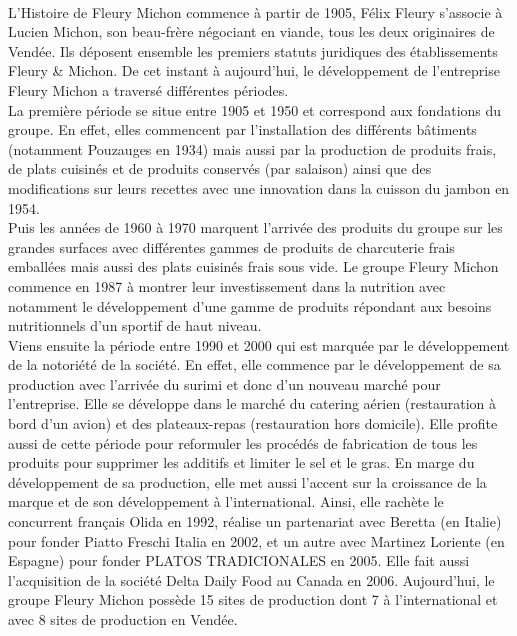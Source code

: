 \documentclass[a4paper,12pt]{extarticle}
\newcommand{\alinea}{\hspace*{0.4cm}}
\begin{document}
		\paragraph{}

	L’Histoire de Fleury Michon commence à partir de 1905, Félix Fleury s'associe à Lucien Michon, son beau-frère négociant en viande, tous les deux originaires de Vendée. Ils déposent ensemble les premiers statuts juridiques des établissements Fleury \& Michon. De cet instant à aujourd’hui, le développement de l’entreprise Fleury Michon a traversé différentes périodes.\\
\alinea
	La première période se situe entre 1905 et 1950 et correspond aux fondations du groupe. En effet, elles commencent par l’installation des différents bâtiments (notamment Pouzauges en 1934) mais aussi par la production de produits frais, de plats cuisinés et de produits conservés (par salaison) ainsi que des modifications sur leurs recettes avec une innovation dans la cuisson du jambon en 1954.\\
\alinea
    Puis les années de 1960 à 1970 marquent l’arrivée des produits du groupe sur les grandes surfaces avec différentes gammes de produits de charcuterie frais emballées mais aussi des plats cuisinés frais sous vide. Le groupe Fleury Michon commence en 1987 à montrer leur investissement dans la nutrition avec notamment le développement d’une gamme de produits répondant aux besoins nutritionnels d’un sportif de haut niveau.\\
\alinea
    Viens ensuite la période entre 1990 et 2000 qui est marquée par le développement de la notoriété de la société. En effet, elle commence par le développement de sa production avec l’arrivée du surimi et donc d’un nouveau marché pour l’entreprise. Elle se développe dans le marché du catering aérien (restauration à bord d’un avion) et des plateaux-repas (restauration hors domicile). Elle profite aussi de cette période pour reformuler les procédés de fabrication de tous les produits pour supprimer les additifs et limiter le sel et le gras.
En marge du développement de sa production, elle met aussi l’accent sur la croissance de la marque et de son développement à l'international. Ainsi, elle rachète le concurrent français Olida en 1992, réalise un partenariat avec Beretta (en Italie) pour fonder Piatto Freschi Italia en 2002, et un autre avec Martinez Loriente (en Espagne) pour fonder PLATOS TRADICIONALES en 2005. Elle fait aussi l'acquisition de la société Delta Daily Food au Canada en 2006. Aujourd’hui, le groupe Fleury Michon possède 15 sites de production dont 7 à l'international et avec 8 sites de production en Vendée.\\
\end{document}
